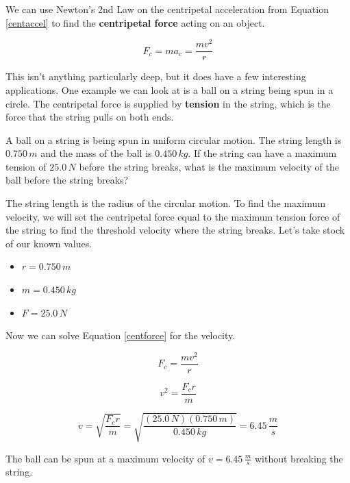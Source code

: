 \documentclass[12pt]{book}
\begin{document}
We can use Newton's 2nd Law on the centripetal acceleration from Equation \ref{centaccel} to find the \textbf{centripetal force} acting on an object.

\begin{equation}
F_c = m a_c = \frac{m v^2}{r}
\label{centforce}
\end{equation}

This isn't anything particularly deep, but it does have a few interesting applications. One example we can look at is a ball on a string being spun in a circle. The centripetal force is supplied by \textbf{tension} in the string, which is the force that the string pulls on both ends.


\begin{exampleblock}

A ball on a string is being spun in uniform circular motion. The string length is $0.750 \, m$ and the mass of the ball is $0.450 \, kg$. If the string can have a maximum tension of $25.0 \, N$ before the string breaks, what is the maximum velocity of the ball before the string breaks?

\hspace{10pt}

The string length is the radius of the circular motion. To find the maximum velocity, we will set the centripetal force equal to the maximum tension force of the string to find the threshold velocity where the string breaks. Let's take stock of our known values.

\begin{itemize}
\item $r = 0.750 \, m$
\item $m = 0.450 \, kg$
\item $F = 25.0 \, N$
\end{itemize}

Now we can solve Equation \ref{centforce} for the velocity.

\begin{equation}
F_c = \frac{m v^2}{r}
\end{equation}

\begin{equation}
v^2 = \frac{F_c r}{m}
\end{equation}

\begin{equation}
v = \sqrt{\frac{F_c r}{m}} = \sqrt{\frac{(25.0 \, N) (0.750 \, m)}{0.450 \, kg}} = 6.45 \, \frac{m}{s}
\end{equation}

The ball can be spun at a maximum velocity of $v = 6.45 \, \frac{m}{s}$ without breaking the string.

\end{exampleblock}
\end{document}
